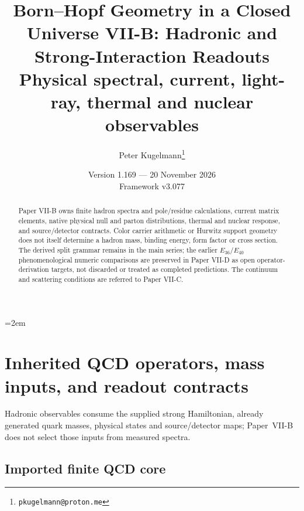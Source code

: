 \documentclass[12pt,a4paper]{article}
\title{\textbf{Born--Hopf Geometry in a Closed Universe VII-B: Hadronic and Strong-Interaction Readouts}\\[0.4em]
\large Physical spectral, current, light-ray, thermal and nuclear observables}
\author{Peter Kugelmann\thanks{\texttt{pkugelmann@proton.me}}}
\date{Version 1.169 --- 20 November 2026 \\ Framework v3.077}
\begin{document}
\emergencystretch=2em
\maketitle
\begin{abstract}
Paper VII-B owns finite hadron spectra and pole/residue calculations,
 current matrix elements, native physical null and parton distributions,
 thermal and nuclear response, and source/detector contracts. Color carrier
 arithmetic or Hurwitz support geometry does not itself determine a hadron
 mass, binding energy, form factor or cross section. The derived split grammar
 remains in the main series; the earlier $E_{36}$/$E_{40}$ phenomenological
 numeric comparisons are preserved in Paper VII-D as open operator-derivation
 targets, not discarded or treated as completed predictions. The continuum
 and scattering conditions are referred to Paper VII-C.
\end{abstract}
\tableofcontents
\listoftables
\clearpage

\section{Inherited QCD operators, mass inputs, and readout contracts}
\label{p11:sec:v237-b1}
Hadronic observables consume the supplied strong Hamiltonian, already generated quark masses, physical states and source/detector maps; Paper~VII-B does not select those inputs from measured spectra.

\label{p11:part:paper-x-interface}


\subsection{Imported finite QCD core}
\label{p11:sec:imported-finite-qcd-core}
\end{document}
